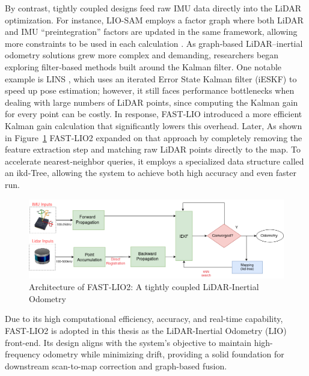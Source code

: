 By contrast, tightly coupled designs feed raw IMU data directly into the LiDAR optimization. For instance, LIO-SAM employs a factor graph where both LiDAR and IMU “preintegration” factors are updated in the same framework, allowing more constraints to be used in each calculation \cite{ShanEtAlLIOSAM2020}. As graph‐based LiDAR–inertial odometry solutions grew more complex and demanding, researchers began exploring filter‐based methods built around the Kalman filter. One notable example is LINS \cite{lins}, which uses an iterated Error State Kalman filter (iESKF) to speed up pose estimation; however, it still faces performance bottlenecks when dealing with large numbers of LiDAR points, since computing the Kalman gain for every point can be costly. In response, FAST‐LIO \cite{xuFastLIO2021} introduced a more efficient Kalman gain calculation that significantly lowers this overhead. Later, As shown in Figure~\ref{fig:fast_lio2_architecture} FAST‐LIO2 \cite{xuFastLIO2} expanded on that approach by completely removing the feature extraction step and matching raw LiDAR points directly to the map. To accelerate nearest‐neighbor queries, it employs a specialized data structure called an ikd‐Tree, allowing the system to achieve both high accuracy and even faster run.

\begin{figure}
    \centering
    \includegraphics[width=1 \linewidth]{images/fast_lio.drawio.png}
    \caption{Architecture of FAST-LIO2: A tightly coupled LiDAR-Inertial Odometry \cite{xuFastLIO2}}
    \label{fig:fast_lio2_architecture}
\end{figure}

Due to its high computational efficiency, accuracy, and real-time capability, FAST-LIO2 is adopted in this thesis as the LiDAR-Inertial Odometry (LIO) front-end. Its design aligns with the system’s objective to maintain high-frequency odometry while minimizing drift, providing a solid foundation for downstream scan-to-map correction and graph-based fusion.

